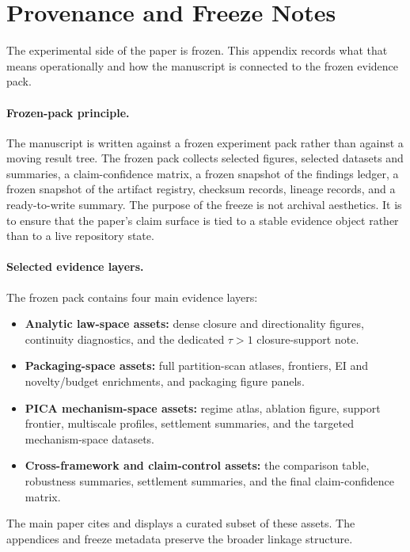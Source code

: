\documentclass[11pt]{article}
\theoremstyle{definition}
\begin{document}
 \section{Provenance and Freeze Notes}
\label{app:provenance}

The experimental side of the paper is frozen. This appendix records what that means operationally and how the manuscript is connected to the frozen evidence pack.

\paragraph{Frozen-pack principle.}
The manuscript is written against a frozen experiment pack rather than against a moving result tree. The frozen pack collects selected figures, selected datasets and summaries, a claim-confidence matrix, a frozen snapshot of the findings ledger, a frozen snapshot of the artifact registry, checksum records, lineage records, and a ready-to-write summary. The purpose of the freeze is not archival aesthetics. It is to ensure that the paper's claim surface is tied to a stable evidence object rather than to a live repository state.

\paragraph{Selected evidence layers.}
The frozen pack contains four main evidence layers:
\begin{itemize}
    \item \textbf{Analytic law-space assets:} dense closure and directionality figures, continuity diagnostics, and the dedicated $\tau>1$ closure-support note.
    \item \textbf{Packaging-space assets:} full partition-scan atlases, frontiers, EI and novelty/budget enrichments, and packaging figure panels.
    \item \textbf{PICA mechanism-space assets:} regime atlas, ablation figure, support frontier, multiscale profiles, settlement summaries, and the targeted mechanism-space datasets.
    \item \textbf{Cross-framework and claim-control assets:} the comparison table, robustness summaries, settlement summaries, and the final claim-confidence matrix.
\end{itemize}
The main paper cites and displays a curated subset of these assets. The appendices and freeze metadata preserve the broader linkage structure.
\end{document}
